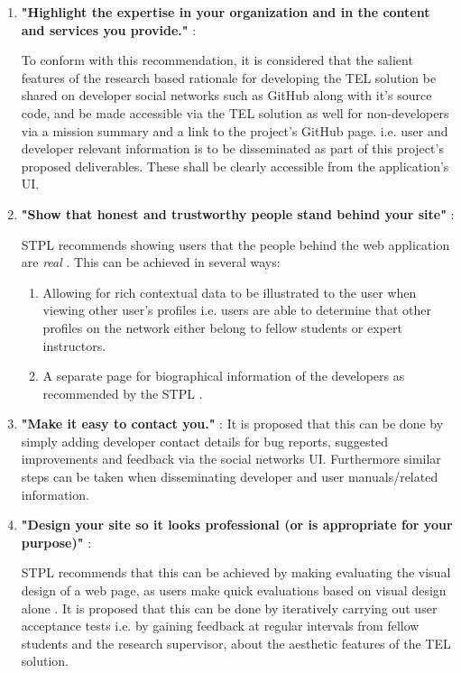 \begin{enumerate}
    \item \textbf{"Highlight the expertise in your organization and in the content and services you provide."} \cite{Fogg2002a}:
    
    To conform with this recommendation, it is considered that the salient features of the research based rationale for developing the TEL solution be shared on developer social networks such as GitHub along with it's source code, and be made accessible via the TEL solution as well for non-developers via a mission summary and a link to the project's GitHub page. i.e. user and developer relevant information is to be disseminated as part of this project's proposed deliverables. These shall be clearly accessible from the application's UI.
    
    \item \textbf{"Show that honest and trustworthy people stand behind your site"} \cite{Fogg2002a}:
    
    STPL recommends showing users that the people behind the web application are \textit{real} \cite{Fogg2002a}. This can be achieved in several ways:
    \begin{enumerate}
        \item Allowing for rich contextual data to be illustrated to the user when viewing other user's profiles i.e. users are able to determine that other profiles on the network either belong to fellow students or expert instructors.
        \item A separate page for biographical information of the developers as recommended by the STPL \cite{Fogg2002a}.
    \end{enumerate}
    
    \item \textbf{"Make it easy to contact you."} \cite{Fogg2002a}:
    It is proposed that this can be done by simply adding developer contact details for bug reports, suggested improvements and feedback via the social networks UI. Furthermore similar steps can be taken when disseminating developer and user manuals/related information.

    \item \textbf{"Design your site so it looks professional (or is appropriate for your purpose)"} \cite{Fogg2002a}:
    
    STPL recommends that this can be achieved by making evaluating the visual design of a web page, as users make quick evaluations based on visual design alone \cite{Fogg2002a}. It is proposed that this can be done by iteratively carrying out user acceptance tests i.e. by gaining feedback at regular intervals from fellow students and the research supervisor, about the aesthetic features of the TEL solution.


\end{enumerate}
